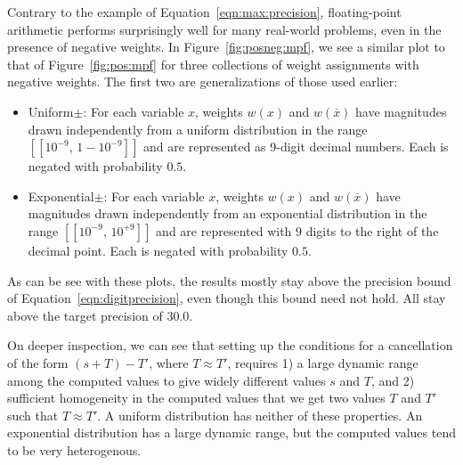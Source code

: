\documentclass[
hf
]{ceurart}
\newcommand{\obar}[1]{\overline{#1}}
\newcommand{\interval}[1]{[\![#1]\!]}
\begin{document}
Contrary to the example of
Equation~\ref{eqn:max:precision},
floating-point arithmetic performs surprisingly well for
many real-world
problems, even in the presence of negative weights.
In Figure~\ref{fig:posneg:mpf}, we see a similar plot to that of Figure~\ref{fig:pos:mpf} for
three collections of weight assignments with negative weights.  The first two are generalizations of those used earlier:
\begin{itemize}
\item \textsf{Uniform$\pm$}: For each variable $x$, weights $w(x)$ and $w(\obar{x})$ have magnitudes drawn independently
from a uniform distribution in the range  $\interval{10^{-9},\,1-10^{-9}}$ and are represented as 9-digit decimal numbers.  Each is negated with probability $0.5$.
\item \textsf{Exponential$\pm$}: For each variable $x$, weights $w(x)$ and $w(\obar{x})$ have magnitudes
  drawn independently from an exponential distribution in the range $\interval{10^{-9},\,10^{+9}}$ and are represented with 9 digits to the right of the decimal point.  Each is negated with probability $0.5$.
\end{itemize}
As can be see with these plots, the results mostly stay above the precision bound of Equation~\ref{eqn:digitprecision},
even though this bound need not hold.  All stay above the target precision of $30.0$.

On deeper inspection, we can see that setting up the conditions for a
cancellation of the form $(s + T) - T'$, where $T \approx T'$, requires
1) a large dynamic range among the computed values to give widely different values $s$ and $T$, and 2) sufficient
homogeneity in the computed values that we get two values $T$ and
$T'$ such that $T \approx T'$.  A uniform distribution has neither of
these properties.  An exponential distribution has a large dynamic
range, but the computed values tend to be very heterogenous.
\end{document}
